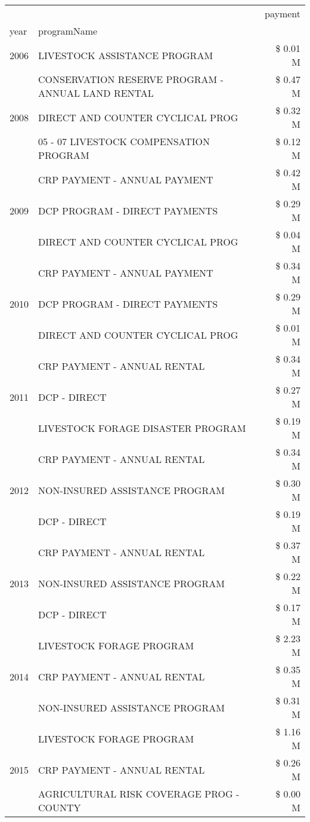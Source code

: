 \begin{tabular}{llr}
\toprule
 &  & payment \\
year & programName &  \\
\midrule
2006 & LIVESTOCK ASSISTANCE PROGRAM & \$ 0.01 M \\
\cline{1-3}
\multirow[t]{3}{*}{2008} & CONSERVATION RESERVE PROGRAM - ANNUAL LAND RENTAL & \$ 0.47 M \\
 & DIRECT AND COUNTER CYCLICAL PROG & \$ 0.32 M \\
 & 05 - 07 LIVESTOCK COMPENSATION PROGRAM & \$ 0.12 M \\
\cline{1-3}
\multirow[t]{3}{*}{2009} & CRP PAYMENT - ANNUAL PAYMENT & \$ 0.42 M \\
 & DCP PROGRAM - DIRECT PAYMENTS & \$ 0.29 M \\
 & DIRECT AND COUNTER CYCLICAL PROG & \$ 0.04 M \\
\cline{1-3}
\multirow[t]{3}{*}{2010} & CRP PAYMENT - ANNUAL PAYMENT & \$ 0.34 M \\
 & DCP PROGRAM - DIRECT PAYMENTS & \$ 0.29 M \\
 & DIRECT AND COUNTER CYCLICAL PROG & \$ 0.01 M \\
\cline{1-3}
\multirow[t]{3}{*}{2011} & CRP PAYMENT - ANNUAL RENTAL & \$ 0.34 M \\
 & DCP - DIRECT & \$ 0.27 M \\
 & LIVESTOCK FORAGE DISASTER PROGRAM & \$ 0.19 M \\
\cline{1-3}
\multirow[t]{3}{*}{2012} & CRP PAYMENT - ANNUAL RENTAL & \$ 0.34 M \\
 & NON-INSURED ASSISTANCE PROGRAM & \$ 0.30 M \\
 & DCP - DIRECT & \$ 0.19 M \\
\cline{1-3}
\multirow[t]{3}{*}{2013} & CRP PAYMENT - ANNUAL RENTAL & \$ 0.37 M \\
 & NON-INSURED ASSISTANCE PROGRAM & \$ 0.22 M \\
 & DCP - DIRECT & \$ 0.17 M \\
\cline{1-3}
\multirow[t]{3}{*}{2014} & LIVESTOCK FORAGE PROGRAM & \$ 2.23 M \\
 & CRP PAYMENT - ANNUAL RENTAL & \$ 0.35 M \\
 & NON-INSURED ASSISTANCE PROGRAM & \$ 0.31 M \\
\cline{1-3}
\multirow[t]{3}{*}{2015} & LIVESTOCK FORAGE PROGRAM & \$ 1.16 M \\
 & CRP PAYMENT - ANNUAL RENTAL & \$ 0.26 M \\
 & AGRICULTURAL RISK COVERAGE PROG - COUNTY & \$ 0.00 M \\

\end{tabular}
